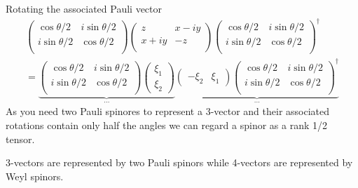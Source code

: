 \documentclass[10pt,a4paper]{book}
\theoremstyle{definition}
\begin{document}
Rotating the associated Pauli vector
\begin{align}
\left(
\begin{matrix}
\cos\theta/2 & i\sin\theta/2\\
i\sin\theta/2 & \cos\theta/2\\
\end{matrix}
\right)
\left(
\begin{matrix}
z& x-iy\\
x+iy&-z\\
\end{matrix}
\right)
\left(
\begin{matrix}
\cos\theta/2 & i\sin\theta/2\\
i\sin\theta/2 & \cos\theta/2\\
\end{matrix}
\right)^\dagger\\
=\underbrace{\left(
\begin{matrix}
\cos\theta/2 & i\sin\theta/2\\
i\sin\theta/2 & \cos\theta/2\\
\end{matrix}
\right)
\left(
\begin{matrix}
\xi_1 \\
\xi_2 
\end{matrix}
\right)}_{...}
\underbrace{
\left(
\begin{matrix}
-\xi_2&\xi_1 
\end{matrix}
\right)
\left(
\begin{matrix}
\cos\theta/2 & i\sin\theta/2\\
i\sin\theta/2 & \cos\theta/2\\
\end{matrix}
\right)^\dagger}_{...}
\end{align}
As you need two Pauli spinores to represent a 3-vector and their associated rotations contain only half the angles we can regard a spinor as a rank 1/2 tensor.

3-vectors are represented by two Pauli spinors while 4-vectors are represented by Weyl spinors.
\end{document}

